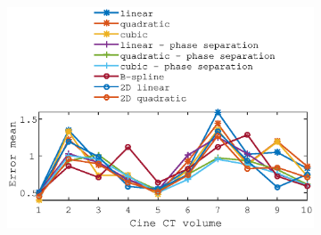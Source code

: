 \documentclass[11pt,a4paper,oneside]{report}
\begin{document}
\begin{figure}
\begin{subfigure}[b]{0.33\textwidth}
    \includegraphics[width=\textwidth, trim=80 163 80 98,clip=true]{figures/task4/def_mean_error_couch1.eps}
  \end{subfigure}%
  

\end{figure}
\end{document}
